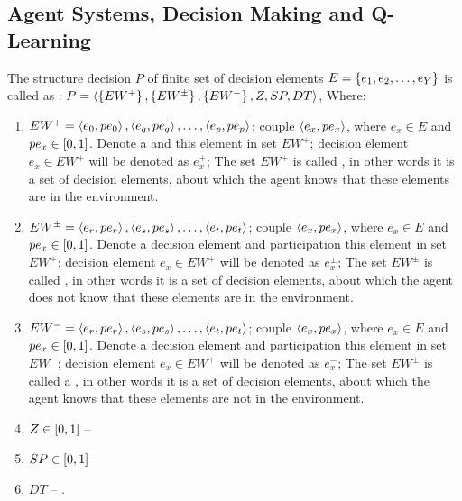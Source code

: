 \subsection{Agent Systems, Decision Making and Q-Learning}

\begin{defi}
The structure decision $P$ of finite set of decision elements $E=\left\{ e_1,e_2,\ldots,e_Y\right\}$ is called as : $P=\left\langle \left\{ EW^+\right\},\left\{ EW^{\pm}\right\},\left\{ EW^-\right\},Z,SP,DT\right\rangle$, Where:
\begin{enumerate}
 \item $EW^+=\left\langle e_0,pe_0\right\rangle,\left\langle e_q,pe_q\right\rangle,\ldots,\left\langle e_p,pe_p\right\rangle$; couple $\left\langle e_x,pe_x\right\rangle$, where $e_x\in E$ and $pe_x\in\left[0,1\right]$. Denote a  and  this element in set $EW^+$; decision element $e_x\in EW^+$ will be denoted as $e_x^+$; The set $EW^+$ is called , in other words it is a set of decision elements, about which the agent knows that these elements are in the environment.
 \item $EW^{\pm}=\left\langle e_r,pe_r\right\rangle,\left\langle e_s,pe_s\right\rangle,\ldots,\left\langle e_t,pe_t\right\rangle$; couple $\left\langle e_x,pe_x\right\rangle$, where $e_x\in E$ and $pe_x\in\left[0,1\right]$. Denote a decision element and participation this element in set $EW^+$; decision element $e_x\in EW^+$ will be denoted as $e_x^{\pm}$; The set $EW^{\pm}$ is called , in other words it is a set of decision elements, about which the agent does not know that these elements are in the environment.
 \item $EW^-=\left\langle e_r,pe_r\right\rangle,\left\langle e_s,pe_s\right\rangle,\ldots,\left\langle e_t,pe_t\right\rangle$; couple $\left\langle e_x,pe_x\right\rangle$, where $e_x\in E$ and $pe_x\in\left[0,1\right]$. Denote a decision element and participation this element in set $EW^-$; decision element $e_x\in EW^+$ will be denoted as $e_x^-$; The set $EW^{\pm}$ is called a , in other words it is a set of decision elements, about which the agent knows that these elements are not in the environment.
 \item $Z\in\left[0,1\right]$ -- 
 \item $SP\in\left[0,1\right]$ -- 
 \item $DT$ -- .
\end{enumerate}
\cite{conf/fedcsis/Sobieska-KarpinskaH12}
\end{defi}

